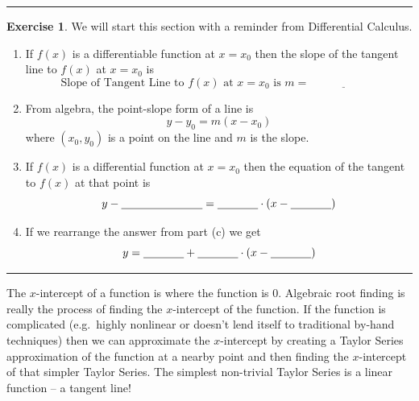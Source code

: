 \documentclass[
]{book}
\providecommand{\tightlist}{%
  \setlength{\itemsep}{0pt}\setlength{\parskip}{0pt}}
\theoremstyle{definition}
\theoremstyle{definition}
\theoremstyle{definition}
\newtheorem{exercise}{Exercise}[chapter]
\theoremstyle{remark}
\begin{document}
\begin{center}\rule{0.5\linewidth}{0.5pt}\end{center}

\begin{exercise}
\protect\hypertarget{exr:unnamed-chunk-98}{}{\label{exr:unnamed-chunk-98} }We will start this section with a reminder from Differential Calculus.\\

\begin{enumerate}
\def\labelenumi{\alph{enumi}.}
\tightlist
\item
  If \(f(x)\) is a differentiable function at \(x=x_0\) then the slope of the tangent line to \(f(x)\) at \(x=x_0\) is
  \[ \text{Slope of Tangent Line to $f(x)$ at $x=x_0$ is } m= \underline{\hspace{1in}} \]
\item
  From algebra, the point-slope form of a line is
  \[ y - y_0 = m(x-x_0) \]
  where \((x_0, y_0)\) is a point on the line and \(m\) is the slope.\\
\item
  If \(f(x)\) is a differential function at \(x=x_0\) then the equation of the tangent to \(f(x)\) at that point is
  \[ y - \underline{\hspace{1in}} = \underline{\hspace{0.5in}} \cdot \left( x - \underline{\hspace{0.5in}} \right) \]
\item
  If we rearrange the answer from part (c) we get
  \[ y = \underline{\hspace{0.5in}} + \underline{\hspace{0.5in}} \cdot \left( x - \underline{\hspace{0.5in}} \right)  \]
\end{enumerate}
\end{exercise}

\begin{center}\rule{0.5\linewidth}{0.5pt}\end{center}

The \(x\)-intercept of a function is where the function is 0. Algebraic root finding is really the process of finding the \(x\)-intercept of the function. If the function is complicated (e.g.~highly nonlinear or doesn't lend itself to traditional by-hand techniques) then we can approximate the \(x\)-intercept by creating a Taylor Series approximation of the function at a nearby point and then finding the \(x\)-intercept of that simpler Taylor Series. The simplest non-trivial Taylor Series is a linear function -- a tangent line!
\end{document}
